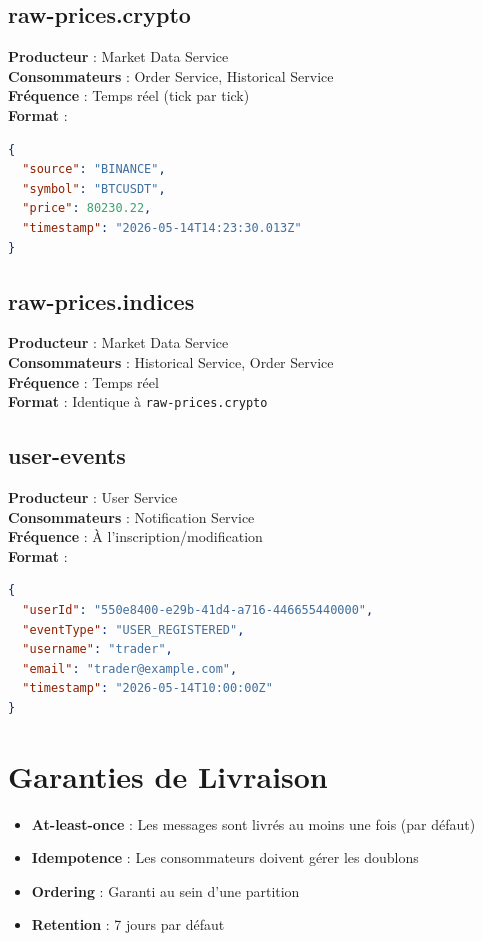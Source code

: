 \documentclass[12pt,a4paper,twoside]{report}
\begin{document}
\subsection{raw-prices.crypto}
\textbf{Producteur} : Market Data Service \\
\textbf{Consommateurs} : Order Service, Historical Service \\
\textbf{Fréquence} : Temps réel (tick par tick) \\
\textbf{Format} :

\begin{lstlisting}[language=json]
{
  "source": "BINANCE",
  "symbol": "BTCUSDT",
  "price": 80230.22,
  "timestamp": "2026-05-14T14:23:30.013Z"
}
\end{lstlisting}

\subsection{raw-prices.indices}
\textbf{Producteur} : Market Data Service \\
\textbf{Consommateurs} : Historical Service, Order Service \\
\textbf{Fréquence} : Temps réel \\
\textbf{Format} : Identique à \texttt{raw-prices.crypto}

\subsection{user-events}
\textbf{Producteur} : User Service \\
\textbf{Consommateurs} : Notification Service \\
\textbf{Fréquence} : À l'inscription/modification \\
\textbf{Format} :

\begin{lstlisting}[language=json]
{
  "userId": "550e8400-e29b-41d4-a716-446655440000",
  "eventType": "USER_REGISTERED",
  "username": "trader",
  "email": "trader@example.com",
  "timestamp": "2026-05-14T10:00:00Z"
}
\end{lstlisting}

\section{Garanties de Livraison}

\begin{itemize}
    \item \textbf{At-least-once} : Les messages sont livrés au moins une fois (par défaut)
    \item \textbf{Idempotence} : Les consommateurs doivent gérer les doublons
    \item \textbf{Ordering} : Garanti au sein d'une partition
    \item \textbf{Retention} : 7 jours par défaut
\end{itemize}
\end{document}
